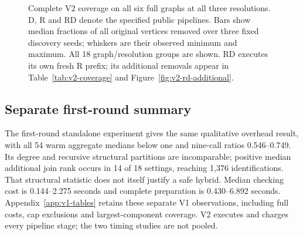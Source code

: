 \documentclass[sigconf,anonymous,review]{acmart}
\newcommand{\1}{\mathbf{1}}
\begin{document}
\begin{figure}[t]
\endgroup
\caption{Complete V2 coverage on all six full graphs at all three resolutions. D, R and RD denote the specified public pipelines. Bars show median fractions of all original vertices removed over three fixed discovery seeds; whiskers are their observed minimum and maximum. All 18 graph/resolution groups are shown. RD executes its own fresh R prefix; its additional removals appear in Table~\ref{tab:v2-coverage} and Figure~\ref{fig:v2-rd-additional}.}\label{fig:v2-coverage}
\end{figure}

\subsection{Separate first-round summary}
The first-round standalone experiment gives the same qualitative overhead
result, with all 54 warm aggregate medians below one and nine-call ratios
0.546--0.749. Its degree and recursive structural partitions are incomparable;
positive median additional join rank occurs in 14 of 18 settings, reaching
1,376 identifications. That structural statistic does not itself justify a
safe hybrid. Median checking cost is 0.144--2.275 seconds and complete
preparation is 0.430--6.892 seconds. Appendix~\ref{app:v1-tables} retains
these separate V1 observations, including full costs, cap exclusions and
largest-component coverage. V2 executes and charges every pipeline stage;
the two timing studies are not pooled.
\end{document}

